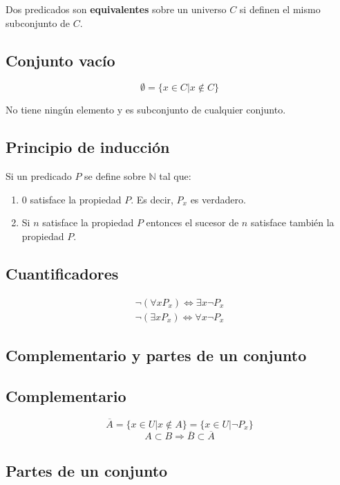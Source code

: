 Dos predicados son \textbf{equivalentes} sobre un universo $C$ si definen el mismo subconjunto de $C$.

\subsection{Conjunto vacío}

\[
\emptyset = \{ x \in C | x \notin C \}
\]

No tiene ningún elemento y es subconjunto de cualquier conjunto.

\subsection{Principio de inducción}

Si un predicado $P$ se define sobre $\mathbb{N}$ tal que:
\begin{enumerate}
	\item $0$ satisface la propiedad $P$. Es decir, $P_x$ es verdadero.
	\item Si $n$ satisface la propiedad $P$ entonces el sucesor de $n$ satisface también la propiedad $P$.
\end{enumerate}

\subsection{Cuantificadores}

\begin{align*}
\neg (\forall x P_x) \Leftrightarrow \exists x \neg P_x \\
\neg (\exists x P_x) \Leftrightarrow \forall x \neg P_x
\end{align*}

\subsection{Complementario y partes de un conjunto}

\subsection{Complementario}

\[
\overline{A} = \{x \in U | x \notin A\} = \{x \in U | \neg P_x\}
\]
\[
A \subset B \Rightarrow \overline{B} \subset \overline{A}
\]

\subsection{Partes de un conjunto}

